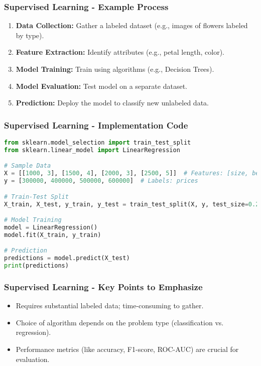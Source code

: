 \documentclass[aspectratio=169]{beamer}
\begin{document}
\begin{frame}[fragile]
    \frametitle{Supervised Learning - Example Process}
    \begin{enumerate}
        \item \textbf{Data Collection:} Gather a labeled dataset (e.g., images of flowers labeled by type).
        \item \textbf{Feature Extraction:} Identify attributes (e.g., petal length, color).
        \item \textbf{Model Training:} Train using algorithms (e.g., Decision Trees).
        \item \textbf{Model Evaluation:} Test model on a separate dataset.
        \item \textbf{Prediction:} Deploy the model to classify new unlabeled data.
    \end{enumerate}
\end{frame}

\begin{frame}[fragile]
    \frametitle{Supervised Learning - Implementation Code}
    \begin{lstlisting}[language=Python]
from sklearn.model_selection import train_test_split
from sklearn.linear_model import LinearRegression

# Sample Data
X = [[1000, 3], [1500, 4], [2000, 3], [2500, 5]]  # Features: [size, bedrooms]
y = [300000, 400000, 500000, 600000]  # Labels: prices

# Train-Test Split
X_train, X_test, y_train, y_test = train_test_split(X, y, test_size=0.2, random_state=42)

# Model Training
model = LinearRegression()
model.fit(X_train, y_train)

# Prediction
predictions = model.predict(X_test)
print(predictions)
    \end{lstlisting}
\end{frame}

\begin{frame}
    \frametitle{Supervised Learning - Key Points to Emphasize}
    \begin{itemize}
        \item Requires substantial labeled data; time-consuming to gather.
        \item Choice of algorithm depends on the problem type (classification vs. regression).
        \item Performance metrics (like accuracy, F1-score, ROC-AUC) are crucial for evaluation.
    \end{itemize}
\end{frame}
\end{document}
